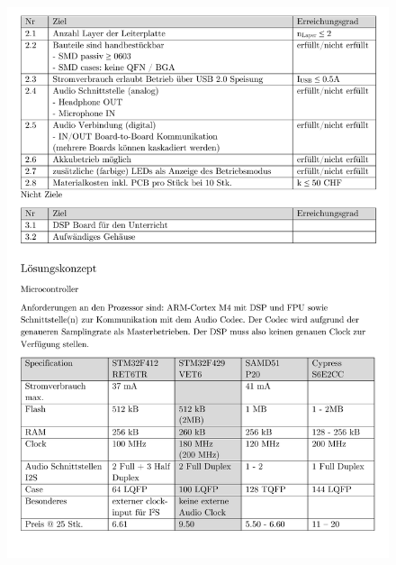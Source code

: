 \begin{appendix}
\begin{figure}[h]
	\centering
	\includegraphics[width=0.95\linewidth]{appendix/pflichtenheft(2).pdf}
\end{figure}


\end{appendix}
